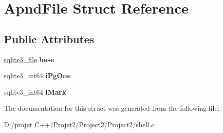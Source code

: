 \hypertarget{struct_apnd_file}{}\section{Apnd\+File Struct Reference}
\label{struct_apnd_file}
\subsection*{Public Attributes}
\begin{DoxyCompactItemize}
\item 
\mbox{\label{struct_apnd_file_a423740b5927686ca724baded1070fc22}} 
\mbox{\hyperlink{structsqlite3__file}{sqlite3\+\_\+file}} {\bfseries base}
\item 
\mbox{\label{struct_apnd_file_ae0ad9a2bf33cf4dba196ec7bf7ad2561}} 
sqlite3\+\_\+int64 {\bfseries i\+Pg\+One}
\item 
\mbox{\label{struct_apnd_file_a2659b975dee9b8cf245989b0ff0a8ee1}} 
sqlite3\+\_\+int64 {\bfseries i\+Mark}
\end{DoxyCompactItemize}


The documentation for this struct was generated from the following file\+:\begin{DoxyCompactItemize}
\item 
D\+:/projet C++/\+Projet2/\+Project2/\+Project2/shell.\+c\end{DoxyCompactItemize}
